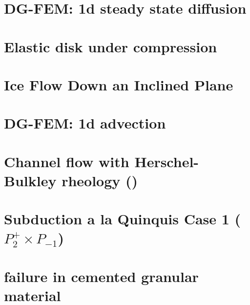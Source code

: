 \documentclass[a4paper,11pt]{report}
\begin{document}
\chapter{DG-FEM: 1d steady state diffusion \label{f57}} %

\chapter{Elastic disk under compression \label{f58}} %

\chapter{Ice Flow Down an Inclined Plane \label{f59}} %

\chapter{DG-FEM: 1d advection \label{f60}} %

\chapter{Channel flow with Herschel-Bulkley rheology (\QtwoQone) \label{f61}} %

\chapter{Subduction a la Quinquis Case 1 ($P_2^+\times P_{-1}$) \label{f62}} %

\chapter{failure in cemented granular material \label{f63}} %
\end{document}
